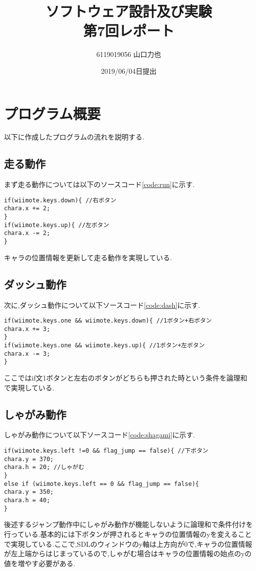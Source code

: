 \documentclass{jarticle}
\title{ソフトウェア設計及び実験\\
	第7回レポート}
\author{6119019056 山口力也}
\date{2019/06/04日提出}
\begin{document}
\maketitle
\section{プログラム概要}
以下に作成したプログラムの流れを説明する.
\subsection{走る動作}
まず走る動作については以下のソースコード\ref{code:run}に示す.

\begin{lstlisting}[caption = 走る動作,label=code:run]
if(wiimote.keys.down){ //右ボタン
chara.x += 2;
}
if(wiimote.keys.up){ //左ボタン
chara.x -= 2;
}
\end{lstlisting}

キャラの位置情報を更新して走る動作を実現している.
\subsection{ダッシュ動作}
次に,ダッシュ動作について以下ソースコード\ref{code:dash}に示す.
\begin{lstlisting}[caption = ダッシュ動作,label=code:dash]
if(wiimote.keys.one && wiimote.keys.down){ //1ボタン+右ボタン
chara.x += 3;
} 
if(wiimote.keys.one && wiimote.keys.up){ //1ボタン+左ボタン
chara.x -= 3; 
}
\end{lstlisting}
ここではif文1ボタンと左右のボタンがどちらも押された時という条件を論理和で実現している.

\subsection{しゃがみ動作}
しゃがみ動作について以下ソースコード\ref{code:shagami}に示す.

\begin{lstlisting}[caption = しゃがみ動作,label=code:shagami]
if(wiimote.keys.left !=0 && flag_jump == false){ //下ボタン
chara.y = 370;
chara.h = 20; //しゃがむ
}
else if (wiimote.keys.left == 0 && flag_jump == false){
chara.y = 350;
chara.h = 40;
}
\end{lstlisting}

後述するジャンプ動作中にしゃがみ動作が機能しないように論理和で条件付けを行っている.基本的には下ボタンが押されるとキャラの位置情報のyを変えることで実現している.ここで,SDLのウィンドウのy軸は上方向が0で,キャラの位置情報が左上端からはじまっているので,しゃがむ場合はキャラの位置情報の始点のyの値を増やす必要がある.
\end{document}
